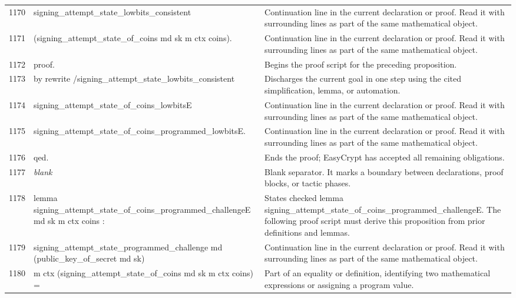 \documentclass[10pt]{article}
\begin{document}
\begin{longtable}{r L{0.53\textwidth} L{0.37\textwidth}}
1170 & {\ttfamily\scriptsize   signing\_attempt\_state\_lowbits\_consistent} & Continuation line in the current declaration or proof.  Read it with surrounding lines as part of the same mathematical object. \\
1171 & {\ttfamily\scriptsize     (signing\_attempt\_state\_of\_coins md sk m ctx coins).} & Continuation line in the current declaration or proof.  Read it with surrounding lines as part of the same mathematical object. \\
1172 & {\ttfamily\scriptsize proof.} & Begins the proof script for the preceding proposition. \\
1173 & {\ttfamily\scriptsize by rewrite /signing\_attempt\_state\_lowbits\_consistent} & Discharges the current goal in one step using the cited simplification, lemma, or automation. \\
1174 & {\ttfamily\scriptsize            signing\_attempt\_state\_of\_coins\_lowbitsE} & Continuation line in the current declaration or proof.  Read it with surrounding lines as part of the same mathematical object. \\
1175 & {\ttfamily\scriptsize            signing\_attempt\_state\_of\_coins\_programmed\_lowbitsE.} & Continuation line in the current declaration or proof.  Read it with surrounding lines as part of the same mathematical object. \\
1176 & {\ttfamily\scriptsize qed.} & Ends the proof; EasyCrypt has accepted all remaining obligations. \\
1177 & {\ttfamily\scriptsize \emph{blank}} & Blank separator.  It marks a boundary between declarations, proof blocks, or tactic phases. \\
1178 & {\ttfamily\scriptsize lemma signing\_attempt\_state\_of\_coins\_programmed\_challengeE md sk m ctx coins :} & States checked lemma signing\_attempt\_state\_of\_coins\_programmed\_challengeE.  The following proof script must derive this proposition from prior definitions and lemmas. \\
1179 & {\ttfamily\scriptsize   signing\_attempt\_state\_programmed\_challenge md (public\_key\_of\_secret md sk)} & Continuation line in the current declaration or proof.  Read it with surrounding lines as part of the same mathematical object. \\
1180 & {\ttfamily\scriptsize     m ctx (signing\_attempt\_state\_of\_coins md sk m ctx coins) =} & Part of an equality or definition, identifying two mathematical expressions or assigning a program value. \\

\end{longtable}
\end{document}
